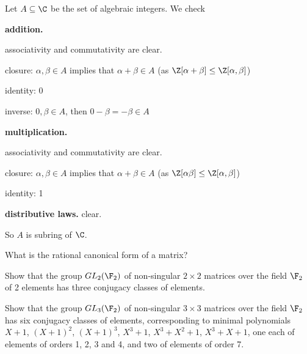 \begin{solution}[\bf Solution.]
Let $A\subseteq \C$ be the set of algebraic integers. We check 

{\bf addition.}
\ben
\item [] associativity and commutativity are clear.
\item [] closure: $\alpha,\beta \in A$ implies that $\alpha + \beta \in A$ (as $\Z[\alpha + \beta] \leq \Z[\alpha,\beta]$)
\item [] identity: 0
\item [] inverse: $0,\beta \in A$, then $0-\beta = -\beta \in A$ 
\een

{\bf multiplication.}
\ben
\item [] associativity and commutativity are clear.
\item [] closure: $\alpha,\beta \in A$ implies that $\alpha + \beta \in A$ (as $\Z[\alpha\beta] \leq \Z[\alpha,\beta]$)
\item [] identity: 1
\een

{\bf distributive laws.} clear.

So $A$ is subring of $\C$.
\end{solution}



\begin{problem}
What is the rational canonical form of a matrix?

Show that the group $GL_2(\F_2)$ of non-singular $2 \times 2$ matrices over the field $\F_2$ of 2 elements has three conjugacy classes of elements.

Show that the group $GL_3(\F_2)$ of non-singular $3\times 3$ matrices over the field $\F_2$ has six conjugacy classes of elements, corresponding to minimal polynomials $X+1$, $(X+1)^2$, $(X+1)^3$, $X^3+1$, $X^3+X^2+1$, $X^3+X+1$, one each of elements of orders 1, 2, 3 and 4, and two of elements of order 7.
\end{problem}

